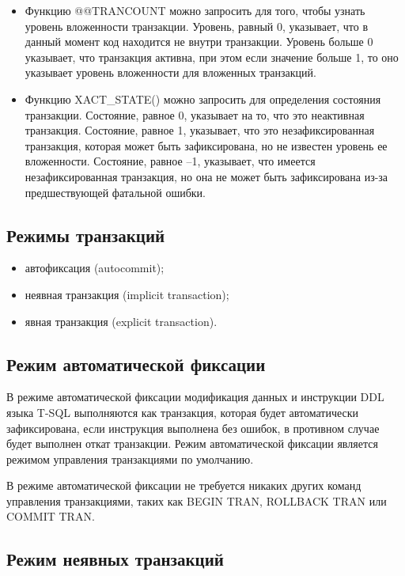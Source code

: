 \begin{itemize}
	\item Функцию @@TRANCOUNT можно запросить для того, чтобы узнать уровень вложенности транзакции. Уровень, равный 0, указывает, что в данный момент код находится не внутри
	транзакции. Уровень больше 0 указывает, что транзакция активна, при этом если значение
	больше 1, то оно указывает уровень вложенности для вложенных транзакций. 
	\item Функцию XACT\_STATE() можно запросить для определения состояния транзакции.  Состояние, равное 0, указывает на то, что это неактивная транзакция. Состояние, равное 1, указывает, что это незафиксированная транзакция, которая может быть зафиксирована, но не известен уровень ее вложенности. Состояние, равное –1, указывает, что имеется незафиксированная транзакция,
	но она не может быть зафиксирована из-за предшествующей фатальной
	ошибки. 
\end{itemize}


\subsection{Режимы транзакций}

\begin{itemize}
	\item автофиксация (autocommit); 
	\item неявная транзакция (implicit transaction); 
	\item явная транзакция (explicit transaction). 
\end{itemize}


\subsection{Режим автоматической фиксации}
В режиме автоматической фиксации модификация данных и инструкции DDL языка T-SQL выполняются как транзакция, которая будет автоматически зафиксирована, если инструкция выполнена без ошибок, в противном случае будет выполнен
откат транзакции. Режим автоматической фиксации является режимом управления транзакциями по умолчанию.



В режиме автоматической фиксации не требуется никаких других команд управления транзакциями, таких как BEGIN TRAN, ROLLBACK TRAN или COMMIT TRAN. 

\subsection{Режим неявных транзакций}

